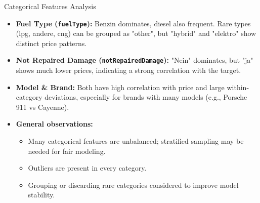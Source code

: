 \documentclass{beamer}
\begin{document}
\begin{frame}{Categorical Features Analysis}
        \begin{itemize}
                \item \textbf{Fuel Type (\texttt{fuelType}):} Benzin dominates,
                        diesel also frequent. Rare types (lpg, andere, cng) can
                        be grouped as "other", but "hybrid" and "elektro" show
                        distinct price patterns.
                \item \textbf{Not Repaired Damage
                        (\texttt{notRepairedDamage}):} "Nein" dominates, but
                        "ja" shows much lower prices, indicating a strong
                        correlation with the target.
                \item \textbf{Model \& Brand:} Both have high correlation with
                        price and large within-category deviations, especially
                        for brands with many models (e.g., Porsche 911 vs
                        Cayenne).
                \item \textbf{General observations:}
                        \begin{itemize}
                                \item Many categorical features are unbalanced;
                                        stratified sampling may be needed for
                                        fair modeling.
                                \item Outliers are present in every category.
                                \item Grouping or discarding rare categories
                                        considered to improve model stability.
                        \end{itemize}
        \end{itemize}
\end{frame}
\end{document}
